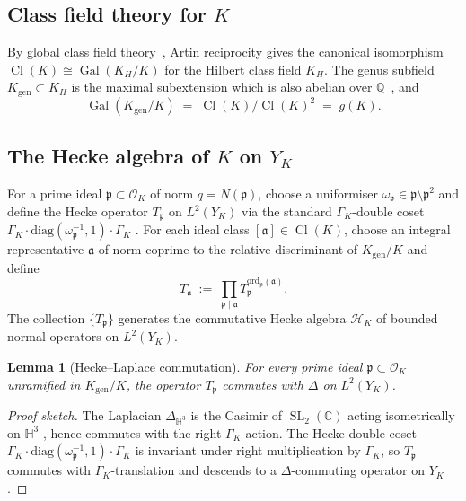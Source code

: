 \documentclass[11pt,a4paper,reqno]{amsart}
\newtheorem{lemma}[theorem]{Lemma}
\theoremstyle{definition}
\DeclareMathOperator{\SL}{SL}
\DeclareMathOperator{\Cl}{Cl}
\DeclareMathOperator{\Gal}{Gal}
\newcommand{\OK}{\mathcal{O}_K}
\newcommand{\HH}{\mathbb{H}}
\newcommand{\CC}{\mathbb{C}}
\newcommand{\QQ}{\mathbb{Q}}
\newcommand{\fp}{\mathfrak{p}}
\newcommand{\fa}{\mathfrak{a}}
\newcommand{\YK}{Y_K}
\newcommand{\GK}{\Gamma_K}
\newcommand{\gK}{g(K)}
\newcommand{\Kgen}{K_{\mathrm{gen}}}
\newcommand{\KH}{K_H}
\newcommand{\Heis}{\mathcal{H}}
\begin{document}
\subsection{Class field theory for $K$}\label{ss:CFT}

By global class field theory~\cite[\S VI.6]{Neukirch1999}, Artin reciprocity gives the canonical isomorphism $\Cl(K)\cong\Gal(\KH/K)$ for the Hilbert class field $\KH$. The genus subfield $\Kgen\subset\KH$ is the maximal subextension which is also abelian over $\QQ$~\cite[Thm.~6.1]{Cox1989}, and
\begin{equation}\label{eq:CFTgenus}
  \Gal(\Kgen/K) \;=\; \Cl(K)/\Cl(K)^2 \;=\; \gK.
\end{equation}

\subsection{The Hecke algebra of $K$ on $\YK$}\label{ss:Heckealgebra}

For a prime ideal $\fp\subset\OK$ of norm $q=N(\fp)$, choose a uniformiser $\omega_\fp\in\fp\setminus\fp^2$ and define the Hecke operator $T_\fp$ on $L^2(\YK)$ via the standard $\GK$-double coset
$\GK \cdot \mathrm{diag}(\omega_\fp^{-1},1)\cdot\GK$ \cite[\S7.6]{ElstrodtGrunewaldMennicke1998}. For each ideal class $[\fa]\in\Cl(K)$, choose an integral representative $\fa$ of norm coprime to the relative discriminant of $\Kgen/K$ and define
\[
  T_\fa \;:=\; \prod_{\fp\mid\fa} T_\fp^{\mathrm{ord}_\fp(\fa)}.
\]
The collection $\{T_\fp\}$ generates the commutative Hecke algebra $\Heis_K$ of bounded normal operators on $L^2(\YK)$.

\begin{lemma}[Hecke--Laplace commutation]\label{lem:HeckeLaplace}
For every prime ideal $\fp\subset\OK$ unramified in $\Kgen/K$, the operator $T_\fp$ commutes with $\Delta$ on $L^2(\YK)$.
\end{lemma}

\begin{proof}[Proof sketch]
The Laplacian $\Delta_{\HH^3}$ is the Casimir of $\SL_2(\CC)$ acting isometrically on $\HH^3$ \cite[\S\S3--4]{ElstrodtGrunewaldMennicke1998}, hence commutes with the right $\GK$-action. The Hecke double coset $\GK\cdot\mathrm{diag}(\omega_\fp^{-1},1)\cdot\GK$ is invariant under right multiplication by $\GK$, so $T_\fp$ commutes with $\GK$-translation and descends to a $\Delta$-commuting operator on $\YK$ \cite[\S7.6.6]{ElstrodtGrunewaldMennicke1998}.
\end{proof}
\end{document}
